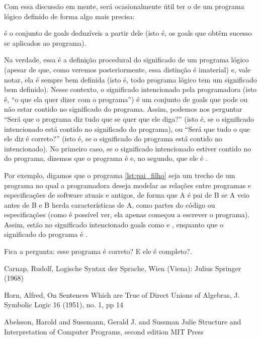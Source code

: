 Com essa discussão em mente, será ocasionalmente útil ter o  de um programa lógico definido de forma algo mais precisa:

  \theoremstyle{definition}
  \begin{definition}  é o conjunto de goals deduzíveis a partir dele (isto é, os goals que obtêm sucesso se aplicados ao programa).
  \end{definition}

  Na verdade, essa é a definição procedural do significado de um programa lógico (apesar de que, como veremos posteriormente, essa distinção é imaterial) e, vale notar, ela é sempre bem definida (isto é, todo programa lógico tem um significado bem definido). Nesse contexto, o significado intencionado pela programadora (isto é, ``o que ela quer dizer com o programa'') é um conjunto de goals que pode ou não estar contido no significado do programa. Assim, podemos nos perguntar ``Será que o
  programa diz tudo que se quer que ele diga?'' (isto é, se o significado intencionado está contido no significado do programa), ou ``Será que tudo o que ele diz é correto?'' (isto é, se o significado do programa está contido no intencionado). No primeiro caso, se o significado intencionado estiver contido no do programa, dizemos que o programa é  e, no segundo, que ele é .

  Por exemplo, digamos que o programa \ref{lst:pai_filho}  seja um trecho de um programa no qual a programadora deseja modelar as relações entre programas e especificações de software atuais e antigos, de forma que A é pai de B se A veio antes de B e B herda características de A, como partes do código ou especificações (como é possível ver, ela apenas começou a escrever o programa). Assim, estão no significado intencionado goals como  e , enquanto que o
  significado do programa é .

  Fica a pergunta: esse programa é correto? E ele é completo?.


  \begin{thebibliography}{1}

     Carnap, Rudolf,
     Logische Syntax der Sprache,
     Wien (Viena): Julius Springer (1968)

     Horn, Alfred,
     On Sentences Which are True of Direct Unions of Algebras,
     J. Symbolic Logic 16 (1951),
     no. 1,
     pp 14

     Abelsson, Harold and Sussmann, Gerald J. and Sussman Julie
     Structure and Interpretation of Computer Programs, second edition
     MIT Press

  \end{thebibliography}


